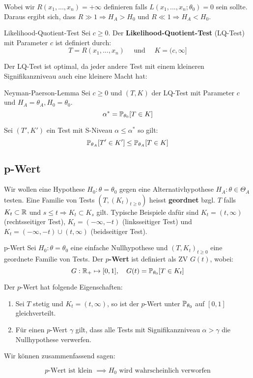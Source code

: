 Wobei wir $R(x_1,...,x_n) = + \infty$ definieren falls $L(x_1,...,x_n; \theta_0) = 0$ sein sollte. Daraus ergibt sich, dass $R \gg 1 \Rightarrow H_A > H_0$ und $R \ll 1 \Rightarrow H_A < H_0$. \smallskip

\begin{mainbox}{Likelihood-Quotient-Test} 
    Sei $c \geq 0$. Der \textbf{Likelihood-Quotient-Test} (LQ-Test) mit Parameter $c$ ist definiert durch:
    $$ T = R(x_1,...,x_n) \quad \text{ und } \quad K = (c, \infty] $$
\end{mainbox}

Der LQ-Test ist optimal, da jeder andere Test mit einem kleineren Signifikanzniveau auch eine kleinere Macht hat:

\begin{mainbox}{Neyman-Paerson-Lemma}
    Sei $c \geq 0$ und $(T,K)$ der LQ-Test mit Parameter $c$ und $H_A = \theta_A, H_0 = \theta_0$.
$$\alpha^* = \mathbb{P}_{\theta_0}[T \in K]$$

Sei $(T', K')$ ein Test mit S-Niveau $\alpha \leq \alpha^*$ so gilt:
$$\mathbb{P}_{\theta_A}[T' \in K'] \leq \mathbb{P}_{\theta_A}[T \in K]$$
\end{mainbox}

\subsection{p-Wert}

Wir wollen eine Hypothese $H_0 : \theta = \theta_0$ gegen eine Alternativhypothese $H_A : \theta \in \Theta_A$ testen. Eine Familie von Tests $(T, (K_t)_{t \geq 0})$ heisst \textbf{geordnet} bzgl. $T$ falls $K_t \subset \mathbb{R}$ und $s \leq t \Rightarrow K_t \subset K_s$ gilt. Typische Beispiele dafür sind $K_t = (t, \infty)$ (rechtsseitiger Test), $K_t = (-\infty, -t)$ (linksseitiger Test) und $K_t =  (-\infty, -t) \cup (t, \infty)$ (beidseitiger Test).

\begin{mainbox}{p-Wert}
    Sei $H_0: \theta = \theta_0$ eine einfache Nullhypothese und $(T, K_t)_{t \geq 0}$ eine geordnete Familie von Tests. Der \textbf{$p$-Wert} ist definiert als ZV $G(t)$, wobei:  
    $$G : \mathbb{R}_+ \mapsto [0,1], \quad G(t) = \mathbb{P}_{\theta_0}[T \in K_t]$$
\end{mainbox}

Der $p$-Wert hat folgende Eigenschaften:
\begin{subbox}{}
\begin{enumerate}
    \item Sei $T$ stetig und $K_t = (t, \infty)$, so ist der $p$-Wert unter $\mathbb{P}_{\theta_0}$ auf $[0,1]$ gleichverteilt.
    \item Für einen $p$-Wert $\gamma$ gilt, dass alle Tests mit Signifikanzniveau $\alpha > \gamma$ die Nullhypothese verwerfen.
\end{enumerate}
\end{subbox}

Wir können zusammenfassend sagen:
\begin{subbox}{}
    $$p\text{-Wert ist klein } \implies H_0 \text{ wird wahrscheinlich verworfen}$$
\end{subbox}

